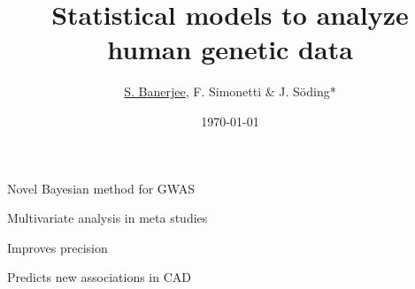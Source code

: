 \documentclass[english, xcolor=table, aspectratio=169]{beamer}
\title{Statistical models to analyze human genetic data}
\author{\underline{S. Banerjee}, F. Simonetti \& J. S\"oding*}
\institute{Max Planck Institute for Biophysical Chemistry}
\date{\today}
\begin{document}
\begin{frame}[label=mytitle]
  \titlepage
\end{frame}

\begin{frame}
  \frametitle{}
  \begin{itemize1}
    \item Novel Bayesian method for GWAS
    \item Multivariate analysis in meta studies
    \item Improves precision
    \item Predicts new associations in CAD
  \end{itemize1}
\end{frame}
\end{document}
